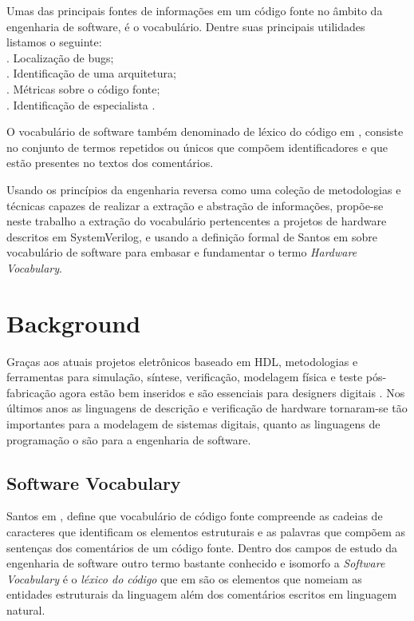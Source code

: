 \documentclass[12pt, twocolumn, a4paper]{article}
\begin{document}
Umas das principais fontes de informações em um código fonte no âmbito da engenharia de software, é o vocabulário. Dentre suas principais utilidades listamos o seguinte:\\
. Localização de bugs;\\
. Identificação de uma arquitetura;\\
. Métricas sobre o código fonte;\\
. Identificação de especialista \cite{Santos2015}.

O vocabulário de software também denominado de léxico do código em \cite{Biggers2011}, consiste no conjunto de termos repetidos ou únicos que compõem identificadores e que estão presentes no textos dos comentários\cite{Abebe2009}.

Usando os princípios da engenharia reversa como uma coleção de metodologias e técnicas capazes de realizar a extração e abstração de informações\cite{Santos2009}, propõe-se neste trabalho a extração do vocabulário pertencentes a projetos de hardware descritos em SystemVerilog, e usando a definição formal de Santos em \cite{Santos2015} sobre vocabulário de software para embasar e fundamentar o termo \textit{Hardware Vocabulary}. 

	\section{Background}
\quad Graças aos atuais projetos eletrônicos baseado em HDL, metodologias e ferramentas para simulação, síntese, verificação, modelagem física e teste pós-fabricação agora estão bem inseridos e são essenciais para designers digitais \cite{Navabi2015}. Nos últimos anos as linguagens de descrição e verificação de hardware tornaram-se tão importantes para a modelagem de sistemas digitais, quanto as linguagens de programação o são para a engenharia de software. 
	
	\subsection{Software Vocabulary}
\quad Santos em \cite{Santos2009}, define que vocabulário de código fonte compreende as cadeias de caracteres que identificam os elementos estruturais e as palavras que compõem as sentenças dos comentários de um código fonte. Dentro dos campos de estudo da engenharia de software outro termo bastante conhecido e isomorfo a \textit{Software Vocabulary} é o \textit{léxico do código} que em \cite{Biggers2011} são os elementos que nomeiam as entidades estruturais da linguagem além dos comentários escritos em linguagem natural.
\end{document}

